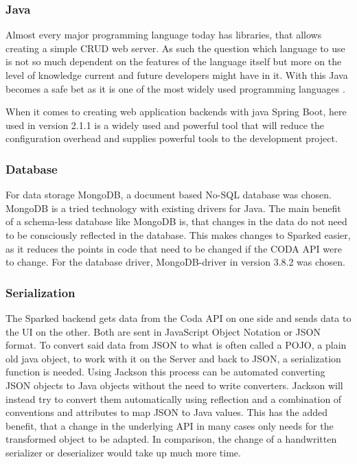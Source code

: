 \subsubsection{Java}
Almost every major programming language today has libraries, that allows creating a simple CRUD web server. As such the question which language to use is not so much dependent on the features of the language itself but more on the level of knowledge current and future developers might have in it. With this Java becomes a safe bet as it is one of the most widely used programming languages \cite{stackoverflowSurvey}. 

When it comes to creating web application backends with java Spring Boot, here used in version 2.1.1 is a widely used and powerful tool that will reduce the configuration overhead and supplies powerful tools to the development project. 

\subsubsection{Database}
For data storage MongoDB, a document based No-SQL database was chosen. MongoDB is a tried technology with existing drivers for Java. The main benefit of a schema-less database like MongoDB is, that changes in the data do not need to be consciously reflected in the database. This makes changes to Sparked easier, as it reduces the points in code that need to be changed if the CODA API were to change. For the database driver, MongoDB-driver in version 3.8.2 was chosen.
\subsubsection{Serialization}
The Sparked backend gets data from the Coda API on one side and sends data to the UI on the other. Both are sent in JavaScript Object Notation or JSON format. To convert said data from JSON to what is often called a POJO, a plain old java object, to work with it on the Server and back to JSON, a serialization function is needed. Using Jackson this process can be automated converting JSON objects to Java objects without the need to write converters. Jackson will instead try to convert them automatically using reflection and a combination of conventions and attributes to map JSON to Java values. This has the added benefit, that a change in the underlying API in many cases only needs for the transformed object to be adapted. In comparison, the change of a handwritten serializer or deserializer would take up much more time. 
